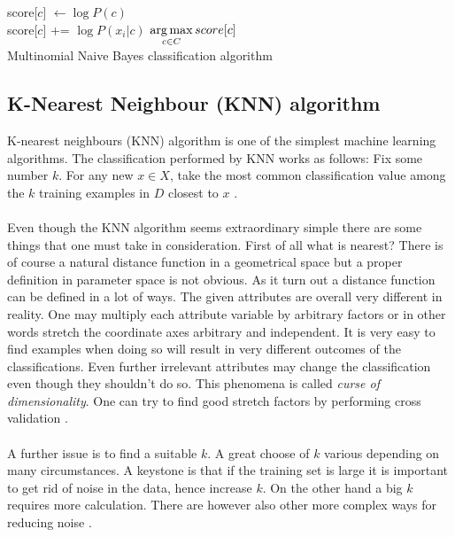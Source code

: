 \begin{algorithm}[h]
 \SetAlgoLined
 {
score[$c$] $\leftarrow \log P(c)$\\
{
	score[$c$] += $\log P(x_i\vert c)$
}
 }
 \Return $\displaystyle \operatorname*{arg\,max}_{c \in C} score[c]$ \\

 \caption{Multinomial Naive Bayes classification algorithm}
 \label{algorithm:naive_bayes_classification}
\end{algorithm}

\subsection{K-Nearest Neighbour (KNN) algorithm}
K-nearest neighbours (KNN) algorithm is one of the simplest machine learning
algorithms. The classification performed by KNN works as follows: Fix some
number $k$. For any new $x \in X$, take the most common classification value among
the $k$ training examples in $D$ closest to $x$ \cite{ml_2011}.
\\\\
Even though the KNN algorithm
seems extraordinary simple there are some things that one must take in
consideration. First of all what is nearest? There is of course a natural
distance function in a geometrical space but a proper definition in parameter
space is not obvious. As it turn out a distance function can be defined in a lot
of ways. The given attributes are overall very different in reality.
One may multiply each attribute variable by arbitrary factors or in other
words stretch the coordinate axes arbitrary and independent. It is very easy to
find examples when doing so will result in very different outcomes of the classifications.
Even further irrelevant attributes may change the classification even though they
shouldn't do so. This phenomena is called \emph{curse of dimensionality}. One
can try to find good stretch factors by performing cross validation \cite{ml_2011}.
\\\\
A further issue is to find a suitable $k$. A great choose of $k$ various
depending on many circumstances. A keystone is that if the training set is large
it is important to get rid of noise in the data, hence increase $k$. On the other
hand a big $k$ requires more calculation. There are however also other more
complex ways for reducing noise \cite{ml_2011}.

